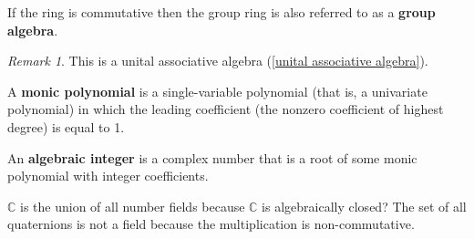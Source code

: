 \documentclass[12pt, letterpaper]{article}
\newcommand{\co}{\mathbb{C}}
\newcommand{\red}[1]{{\color{red} #1}}
\theoremstyle{definition}
\theoremstyle{remark}
\newtheorem*{rem*}{Remark}
\theoremstyle{definition}
\theoremstyle{plain}
\numberwithin{equation}{section}
\begin{document}
	\begin{def*}
		If the ring is commutative then the group ring is also referred to as a \textbf{group algebra}.
	\end{def*}
	\begin{rem*}
		This is a unital associative algebra (\autoref{unital associative algebra}).
	\end{rem*}

	\begin{def*}
		A \textbf{monic polynomial} is a single-variable polynomial (that is, a univariate polynomial) in which the leading coefficient (the nonzero coefficient of highest degree) is equal to 1.
	\end{def*}
	\begin{def*}
		An \textbf{algebraic integer} is a complex number that is a root of some monic polynomial with integer coefficients.
	\end{def*}

	\red{$\co$ is the union of all number fields because $\co$ is algebraically closed?}
	The set of all quaternions is not a field because the multiplication is non-commutative.
	
\end{document}
